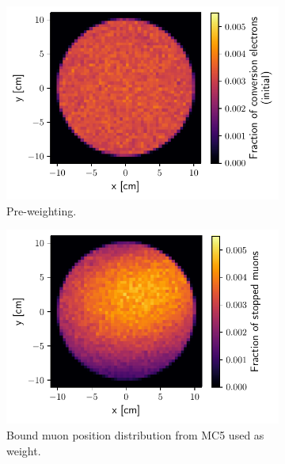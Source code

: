 
\begin{figure}
    \centering
    \begin{subfigure}[t]{0.329\textwidth}
        \centering
        \includegraphics[width=\textwidth]{chapter6/initial_conversion_position_distribution.pdf}
        \caption{Pre-weighting.}
    \end{subfigure}
    \hfill
    \begin{subfigure}[t]{0.329\textwidth}
        \centering
        \includegraphics[width=\textwidth]{chapter6/stopped_muon_distribution.pdf}
        \caption{Bound muon position distribution from MC5 used as weight.}
    \end{subfigure}
    \hfill
    \begin{subfigure}[t]{0.329\textwidth}

\end{subfigure}
\end{figure}
